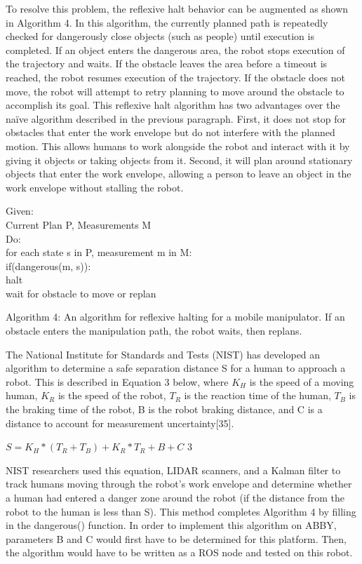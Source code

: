 \documentclass[]{cwru} %
\begin{document}
To resolve this problem, the reflexive halt behavior can be augmented as
shown in Algorithm 4. In this algorithm, the currently planned path is
repeatedly checked for dangerously close objects (such as people) until
execution is completed. If an object enters the dangerous area, the
robot stops execution of the trajectory and waits. If the obstacle
leaves the area before a timeout is reached, the robot resumes execution
of the trajectory. If the obstacle does not move, the robot will attempt
to retry planning to move around the obstacle to accomplish its goal.
This reflexive halt algorithm has two advantages over the naïve
algorithm described in the previous paragraph. First, it does not stop
for obstacles that enter the work envelope but do not interfere with the
planned motion. This allows humans to work alongside the robot and
interact with it by giving it objects or taking objects from it. Second,
it will plan around stationary objects that enter the work envelope,
allowing a person to leave an object in the work envelope without
stalling the robot.

Given:\\ Current Plan P, Measurements M\\Do:\\ for each state s in P,
measurement m in M:\\
if(dangerous(m, s)):\\ halt\\ wait for obstacle to move or replan

Algorithm 4: An algorithm for reflexive
halting for a mobile manipulator. If an obstacle enters the manipulation
path, the robot waits, then replans.

The National Institute for Standards and Tests (NIST) has developed an
algorithm to determine a safe separation distance S for a human to
approach a robot. This is described in Equation 3 below, where
$K_H$ is the speed of a moving human, $K_R$ is
the speed of the robot, $T_R$ is the reaction time of the
human, $T_B$ is the braking time of the robot, B is the
robot braking distance, and C is a distance to account for measurement
uncertainty{[}35{]}.

\(S = K_{H}*\left( T_{R} + T_{B} \right) + K_{R}*T_{R} + B + C\) 3

NIST researchers used this equation, LIDAR scanners, and a Kalman filter
to track humans moving through the robot's work envelope and determine
whether a human had entered a danger zone around the robot (if the
distance from the robot to the human is less than S). This method
completes Algorithm 4 by filling in the dangerous() function. In order
to implement this algorithm on ABBY, parameters B and C would first have
to be determined for this platform. Then, the algorithm would have to be
written as a ROS node and tested on this robot.

\backmatter



\end{document}
